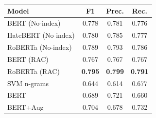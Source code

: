 \documentclass{article}
\begin{document}
\begin{center}
\label{tab:ihc_comparison}
\begin{tabular}{lccc}
\toprule
\textbf{Model} & \textbf{F1} & \textbf{Prec.} & \textbf{Rec.} \\
\midrule
BERT (No-index)     & 0.778 & 0.781 & 0.776 \\
HateBERT (No-index) & 0.780 & 0.785 & 0.777 \\
RoBERTa (No-index)  & 0.789 & 0.793 & 0.786 \\
\midrule
BERT (RAC)          & 0.767 & 0.767 & 0.767 \\
RoBERTa (RAC)       & \textbf{0.795} & \textbf{0.799} & \textbf{0.791} \\
\midrule
SVM n-grams~\cite{elsherief2021latent} & 0.644 & 0.614 & 0.677 \\
BERT~\cite{elsherief2021latent}        & 0.689 & 0.721 & 0.660 \\
BERT+Aug~\cite{elsherief2021latent}    & 0.704 & 0.678 & 0.732 \\
\bottomrule
\end{tabular}
\end{center}

\vspace{0.5em}
\end{document}
